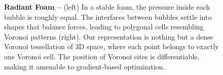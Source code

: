 \begin{figure}[b!]
\centering
{}
\hfill
{}
\caption{\textbf{Radiant Foam -- }
% 
(left) In a stable foam, the pressure inside each bubble is roughly equal.
The interfaces between bubbles settle into shapes that balance forces, leading to polygonal cells resembling Voronoi patterns (right).
Our representation is nothing but a dense Voronoi tessellation of 3D space, where each point belongs to exactly one Voronoi cell.
The position of Voronoi sites is differentiable, making it amenable to gradient-based optimization.
% 
}
\label{fig:subteaser}
\end{figure}